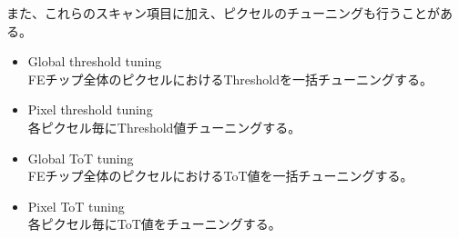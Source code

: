 また、これらのスキャン項目に加え、ピクセルのチューニングも行うことがある。
\begin{itemize}
  \item Global threshold tuning \\
  FEチップ全体のピクセルにおけるThresholdを一括チューニングする。
  \item Pixel threshold tuning \\
  各ピクセル毎にThreshold値チューニングする。
  \item Global ToT tuning \\
  FEチップ全体のピクセルにおけるToT値を一括チューニングする。
  \item Pixel ToT tuning \\
  各ピクセル毎にToT値をチューニングする。
\end{itemize}




